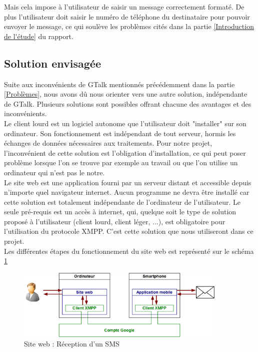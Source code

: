 Mais cela impose à l'utilisateur de saisir un message correctement formaté.
De plus l'utilisateur doit saisir le numéro de téléphone du destinataire pour pouvoir envoyer le message, ce qui soulève les problèmes cités dans la partie \ref{Introduction de l'étude} du rapport.
\\




\subsection{Solution envisagée}

Suite aux inconvénients de GTalk mentionnés précédemment dans la partie \ref{Problèmes}, nous avons dû nous orienter vers une autre solution, indépendante de GTalk.
Plusieurs solutions sont possibles offrant chacune des avantages et des inconvénients.
\\


Le client lourd est un logiciel autonome que l'utilisateur doit "installer" sur son ordinateur.
Son fonctionnement est indépendant de tout serveur, hormis les échanges de données nécessaires aux traitements.
Pour notre projet, l'inconvénient de cette solution est l'obligation d'installation, ce qui peut poser problème lorsque l'on se trouve par exemple au travail ou que l'on utilise un ordinateur qui n'est pas le notre.
\\


Le site web est une application fourni par un serveur distant et accessible depuis n'importe quel navigateur internet.
Aucun programme ne devra être installé car cette solution est totalement indépendante de l'ordinateur de l'utilisateur.
Le seule pré-requis est un accès à internet, qui, quelque soit le type de solution proposé à l'utilisateur (client lourd, client léger, ...), est obligatoire pour l'utilisation du protocole XMPP.
C'est cette solution que nous utiliseront dans ce projet.
\\


Les différentes étapes du fonctionnement du site web est représenté sur le schéma \ref{schemaFonctionnement_siteWeb}
\begin{figure}[!h]
	\center
	\includegraphics[width=0.9\textwidth]{img/schemaFonctionnement_siteWeb.png}
	\caption{Site web : Réception d'un SMS}
	\label{schemaFonctionnement_siteWeb}
\end{figure}
~~\\
